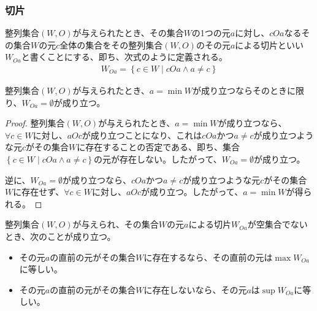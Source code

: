 \documentclass[dvipdfmx]{jsarticle}
\begin{document}
\subsubsection{切片}%
\begin{dfn}
整列集合$(W,O)$が与えられたとき、その集合$W$の1つの元$a$に対し、$cOa$なるその集合$W$の元$c$全体の集合をその整列集合$(W,O)$のその元$a$による切片といい$W_{Oa}$と書くことにする、即ち、次式のように定義される。
\begin{align*}
W_{Oa} = \left\{ c \in W \middle| cOa \land a \neq c \right\}
\end{align*}
\end{dfn}
\begin{thm}\label{1.3.2.6}
整列集合$(W,O)$が与えられたとき、$a = \min W$が成り立つならそのときに限り、$W_{Oa} = \emptyset $が成り立つ。
\end{thm}
\begin{proof}
整列集合$(W,O)$が与えられたとき、$a = \min W$が成り立つなら、$\forall c \in W$に対し、$aOc$が成り立つことになり、これは$cOa$かつ$a \neq c$が成り立つような元$c$がその集合$W$に存在することの否定である、即ち、集合$\left\{ c \in W \middle| cOa \land a \neq c \right\}$の元が存在しない。したがって、$W_{Oa} = \emptyset $が成り立つ。\par
逆に、$W_{Oa} = \emptyset $が成り立つなら、$cOa$かつ$a \neq c$が成り立つような元$c$がその集合$W$に存在せず、$\forall c \in W$に対し、$aOc$が成り立つ。したがって、$a = \min W$が得られる。
\end{proof}
\begin{thm}\label{1.3.2.7}
整列集合$(W,O)$が与えられ、その集合$W$の元$a$による切片$W_{Oa}$が空集合でないとき、次のことが成り立つ。
\begin{itemize}
\item
  その元$a$の直前の元がその集合$W$に存在するなら、その直前の元は$\max W_{Oa}$に等しい。
\item
  その元$a$の直前の元がその集合$W$に存在しないなら、その元$a$は$\sup W_{Oa}$に等しい。
\end{itemize}
\end{thm}
\end{document}
